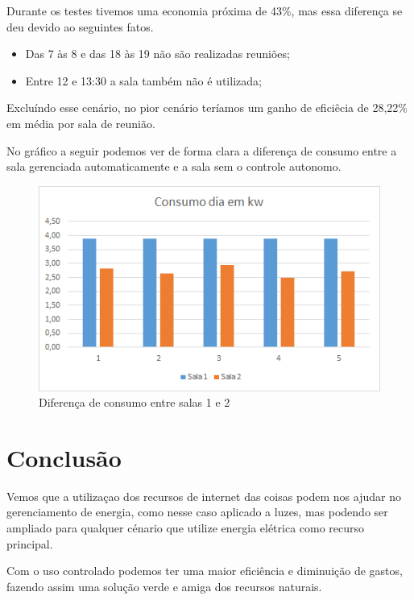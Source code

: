 \documentclass[openright]{normas-utf-tex} %
\begin{document}
Durante os testes tivemos uma economia próxima de 43\%, mas essa diferença se deu devido ao seguintes fatos. 

\begin{itemize}
    \item Das 7 às 8 e das 18 às 19 não são realizadas reuniões;
    \item Entre 12 e 13:30 a sala também não é utilizada;
\end{itemize}

Excluíndo esse cenário, no pior cenário teríamos um ganho de eficiêcia de 28,22\% em média por sala de reunião.

No gráfico a seguir podemos ver de forma clara a diferença de consumo entre a sala gerenciada automaticamente e a sala sem o controle autonomo. 

\begin{figure}[!htb]
     \centering
     \includegraphics[scale=0.8]{g2.png}
     \caption{Diferença de consumo entre salas 1 e 2}
     \label{}
\end{figure}




\chapter{Conclusão}

Vemos que a utilizaçao dos recursos de internet das coisas podem nos ajudar no gerenciamento de energia, como nesse caso aplicado a luzes, mas podendo ser ampliado para qualquer cénario que utilize energia elétrica como recurso principal.

Com o uso controlado podemos ter uma maior eficiência e diminuição de gastos, fazendo assim uma solução verde e amiga dos recursos naturais.
\end{document}
